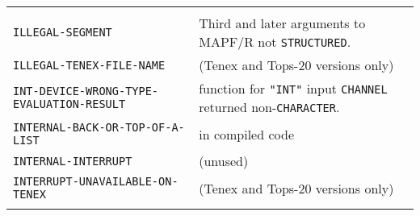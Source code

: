 \documentclass[a4paper,]{article}
\begin{document}
\begin{longtable}[]{@{}ll@{}}
\begin{minipage}[t]{0.36\columnwidth}
\strut
\end{minipage}\tabularnewline
\begin{minipage}[t]{0.58\columnwidth}\raggedright\strut
\texttt{ILLEGAL-SEGMENT}\strut
\end{minipage} & \begin{minipage}[t]{0.36\columnwidth}\raggedright\strut
Third and later arguments to MAPF/R not \texttt{STRUCTURED}.\strut
\end{minipage}\tabularnewline
\begin{minipage}[t]{0.58\columnwidth}\raggedright\strut
\texttt{ILLEGAL-TENEX-FILE-NAME}\strut
\end{minipage} & \begin{minipage}[t]{0.36\columnwidth}\raggedright\strut
(Tenex and Tops-20 versions only)\strut
\end{minipage}\tabularnewline
\begin{minipage}[t]{0.58\columnwidth}\raggedright\strut
\texttt{INT-DEVICE-WRONG-TYPE-EVALUATION-RESULT}\strut
\end{minipage} & \begin{minipage}[t]{0.36\columnwidth}\raggedright\strut
function for \texttt{"INT"} input \texttt{CHANNEL} returned non-\texttt{CHARACTER}.\strut
\end{minipage}\tabularnewline
\begin{minipage}[t]{0.58\columnwidth}\raggedright\strut
\texttt{INTERNAL-BACK-OR-TOP-OF-A-LIST}\strut
\end{minipage} & \begin{minipage}[t]{0.36\columnwidth}\raggedright\strut
in compiled code\strut
\end{minipage}\tabularnewline
\begin{minipage}[t]{0.58\columnwidth}\raggedright\strut
\texttt{INTERNAL-INTERRUPT}\strut
\end{minipage} & \begin{minipage}[t]{0.36\columnwidth}\raggedright\strut
(unused)\strut
\end{minipage}\tabularnewline
\begin{minipage}[t]{0.58\columnwidth}\raggedright\strut
\texttt{INTERRUPT-UNAVAILABLE-ON-TENEX}\strut
\end{minipage} & \begin{minipage}[t]{0.36\columnwidth}\raggedright\strut
(Tenex and Tops-20 versions only)\strut
\end{minipage}\tabularnewline
\begin{minipage}[t]{0.58\columnwidth}\raggedright\strut

\end{minipage}
\end{longtable}
\end{document}
